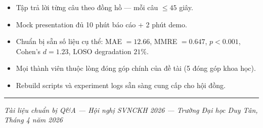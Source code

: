 \documentclass[12pt,a4paper]{article}
\begin{document}
\vspace{0.5em}

\begin{mdframed}[backgroundcolor=darkgreen!8, linecolor=darkgreen,
  linewidth=1.5pt, innerleftmargin=12pt, innerrightmargin=12pt,
  innertopmargin=8pt, innerbottommargin=8pt]
\begin{itemize}[leftmargin=1.5em, itemsep=2pt]
  \item[$\square$] Tập trả lời từng câu theo đồng hồ --- mỗi câu $\leq 45$ giây.
  \item[$\square$] Mock presentation đủ 10 phút báo cáo + 2 phút demo.
  \item[$\square$] Chuẩn bị sẵn số liệu cụ thể: MAE $= 12.66$, MMRE $= 0.647$,
    $p < 0.001$, Cohen's $d = 1.23$, LOSO degradation $21\%$.
  \item[$\square$] Mọi thành viên thuộc lòng đóng góp chính của đề tài
    (5 đóng góp khoa học).
  \item[$\square$] Rebuild scripts và experiment logs sẵn sàng cung cấp cho hội đồng.
\end{itemize}
\end{mdframed}

\vspace{0.5em}
\hrule
\begin{center}
\textit{\small Tài liệu chuẩn bị Q\&A --- Hội nghị SVNCKH 2026 ---
  Trường Đại học Duy Tân, Tháng 4 năm 2026}
\end{center}
\end{document}

